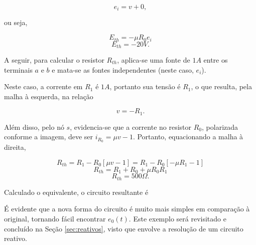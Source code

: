 \documentclass{article}
\numberwithin{equation}{section}
\begin{document}
$$e_i=v+0,$$

\noindent ou seja,

$$E_{th}=-\mu R_0e_i$$
$$E_{th}=-20V.$$

\noindent A seguir, para calcular o resistor $R_{th}$, aplica-se uma fonte de $1A$ entre os terminais $a$ e $b$ e mata-se as fontes independentes (neste caso, $e_i$).

\begin{center}
\end{center}

\noindent Neste caso, a corrente em $R_1$ é $1A$, portanto sua tensão é $R_1$, o que resulta, pela malha à esquerda, na relação

$$v=-R_1.$$

\noindent Além disso, pelo nó $s$, evidencia-se que a corrente no resistor $R_0$, polarizada conforme a imagem, deve ser $i_{R_0}=\mu v - 1$. Portanto, equacionando a malha à direita,

$$R_{th}=R_1-R_0[\mu v-1]=R_1-R_0[-\mu R_1-1]$$
$$R_{th}=R_1+R_0+\mu R_0R_1$$
$$R_{th}=500 \Omega.$$

\noindent Calculado o equivalente, o circuito resultante é

\begin{center}
\end{center}

\noindent É evidente que a nova forma do circuito é muito mais simples em comparação à original, tornando fácil encontrar $e_0(t)$. Este exemplo será revisitado e concluído na Seção \ref{sec:reativos}, visto que envolve a resolução de um circuito reativo.
\end{document}
